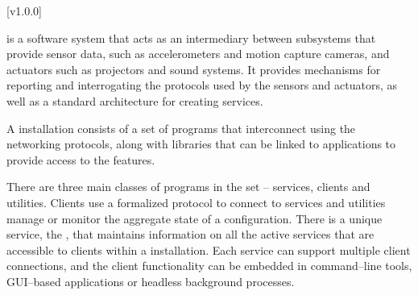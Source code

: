 [v1.0.0]

\mplusm{} is a software system that acts as an intermediary between subsystems that
provide sensor data, such as accelerometers and motion capture cameras, and actuators
such as projectors and sound systems.
It provides mechanisms for reporting and interrogating the protocols used by the sensors
and actuators, as well as a standard architecture for creating services.

A \mplusm{} installation consists of a set of programs that interconnect using the
 networking
protocols, along with libraries that can be linked to applications to provide access to
the \mplusm{} features.

There are three main classes of programs in the set -- services, clients and utilities.
Clients use a formalized protocol to connect to services and utilities manage or monitor
the aggregate state of a \mplusm{} configuration.
There is a unique service, the , that
maintains information on all the active services that are accessible to clients within a
\mplusm{} installation.
Each service can support multiple client connections, and the client functionality can be
embedded in command--line tools, GUI--based applications or headless background processes.

\primaryEnd{}
